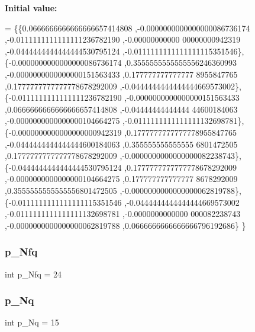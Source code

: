 {\bfseries Initial value\+:}
\begin{DoxyCode}
= \{\{0.0666666666666666657414808 ,-0.0000000000000000086736174 ,-0.0111111111111111236782190 ,-0.00000000000
      00000000942319 ,-0.0444444444444444530795124 ,-0.0111111111111111115351546\},
\{-0.0000000000000000086736174 ,0.3555555555555556246360993 ,-0.0000000000000000151563433 ,0.177777777777777
      8955847765 ,0.1777777777777778678292009 ,-0.0444444444444444669573002\},
\{-0.0111111111111111236782190 ,-0.0000000000000000151563433 ,0.0666666666666666657414808 ,-0.04444444444444
      44600184063 ,-0.0000000000000000104664275 ,-0.0111111111111111132698781\},
\{-0.0000000000000000000942319 ,0.1777777777777778955847765 ,-0.0444444444444444600184063 ,0.355555555555555
      6801472505 ,0.1777777777777778678292009 ,-0.0000000000000000082238743\},
\{-0.0444444444444444530795124 ,0.1777777777777778678292009 ,-0.0000000000000000104664275 ,0.177777777777777
      8678292009 ,0.3555555555555556801472505 ,-0.0000000000000000062819788\},
\{-0.0111111111111111115351546 ,-0.0444444444444444669573002 ,-0.0111111111111111132698781 ,-0.0000000000000
      000082238743 ,-0.0000000000000000062819788 ,0.0666666666666666796192686\}
\}
\end{DoxyCode}
\mbox{\label{a00449_aa030b0a9fe619a48647119bacea600e0}} 
\subsubsection{\texorpdfstring{p\+\_\+\+Nfq}{p\_Nfq}}
{\footnotesize\ttfamily int p\+\_\+\+Nfq = 24}

\mbox{\label{a00449_a207fd9268dfef5bf1505928a4f4c774a}} 
\subsubsection{\texorpdfstring{p\+\_\+\+Nq}{p\_Nq}}
{\footnotesize\ttfamily int p\+\_\+\+Nq = 15}

\mbox{\label{a00449_a0df60dbb73098f125698cce08e503a6e}} 
